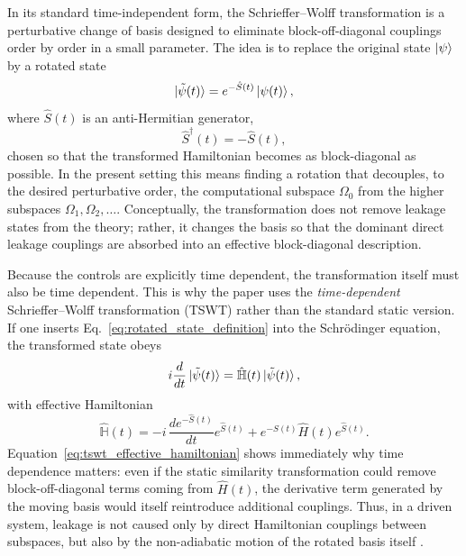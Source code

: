 In its standard time-independent form, the Schrieffer--Wolff transformation is a perturbative change of basis designed to eliminate block-off-diagonal couplings order by order in a small parameter. The idea is to replace the original state $\ket{\psi}$ by a rotated state
\begin{equation}
\ket{\tilde{\psi}(t)}
=
e^{-\hat{S}(t)}\ket{\psi(t)},
\label{eq:rotated_state_definition}
\end{equation}
where $\hat{S}(t)$ is an anti-Hermitian generator,
\begin{equation}
\hat{S}^{\dagger}(t)=-\hat{S}(t),
\label{eq:antihermitian_generator}
\end{equation}
chosen so that the transformed Hamiltonian becomes as block-diagonal as possible. In the present setting this means finding a rotation that decouples, to the desired perturbative order, the computational subspace $\Omega_0$ from the higher subspaces $\Omega_1,\Omega_2,\dots$. Conceptually, the transformation does not remove leakage states from the theory; rather, it changes the basis so that the dominant direct leakage couplings are absorbed into an effective block-diagonal description.

Because the controls are explicitly time dependent, the transformation itself must also be time dependent. This is why the paper uses the \emph{time-dependent} Schrieffer--Wolff transformation (TSWT) rather than the standard static version. If one inserts Eq.~\eqref{eq:rotated_state_definition} into the Schr\"odinger equation, the transformed state obeys
\begin{equation}
i\frac{d}{dt}\ket{\tilde{\psi}(t)}
=
\hat{\mathbb{H}}(t)\ket{\tilde{\psi}(t)},
\label{eq:effective_schrodinger_tswt}
\end{equation}
with effective Hamiltonian
\begin{equation}
\hat{\mathbb{H}}(t)
=
-i\,
\frac{d e^{-\hat{S}(t)}}{dt}
e^{\hat{S}(t)}
+
e^{-\hat{S}(t)}\hat{H}(t)e^{\hat{S}(t)}.
\label{eq:tswt_effective_hamiltonian}
\end{equation}
Equation~\eqref{eq:tswt_effective_hamiltonian} shows immediately why time dependence matters: even if the static similarity transformation could remove block-off-diagonal terms coming from $\hat{H}(t)$, the derivative term generated by the moving basis would itself reintroduce additional couplings. Thus, in a driven system, leakage is not caused only by direct Hamiltonian couplings between subspaces, but also by the non-adiabatic motion of the rotated basis itself \cite{Niu2019}.

